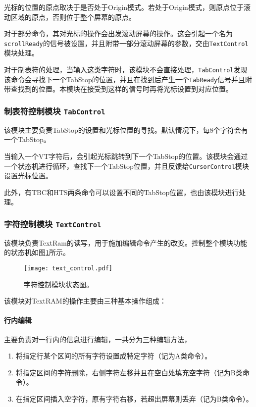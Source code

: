 光标的位置的原点取决于是否处于Origin模式。若处于Origin模式，则原点位于滚动区域的原点，否则位于整个屏幕的原点。

对于部分命令，其对光标的操作会出发滚动屏幕的操作。这会引起一个名为\texttt{scrollReady}的信号被设置，并且附带一部分滚动屏幕的参数，交由\texttt{TextControl}模块处理。

对于制表符的处理，当输入这类字符时，该模块不会直接处理，\texttt{TabControl}发现该命令会寻找下一个TabStop的位置，并且在找到后产生一个\texttt{TabReady}信号并且附带查找到的位置。本模块在接受到这样的信号时再将光标设置到对应位置。

\subsubsection{制表符控制模块 \texttt{TabControl}}
该模块主要负责TabStop的设置和光标位置的寻找。默认情况下，每8个字符会有一个TabStop。

当输入一个VT字符后，会引起光标跳转到下一个TabStop的位置。该模块会通过一个状态机进行循环，查找下一个TabStop位置，并且反馈给\texttt{CursorControl}模块设置光标位置。

此外，有TBC和HTS两条命令可以设置不同的TabStop位置，也由该模块进行处理。
\subsubsection{字符控制模块 \texttt{TextControl}}
该模块负责TextRam的读写，用于施加编辑命令产生的改变。控制整个模块功能的状态机如图\ref{fig:text_control}所示。

\begin{figure}[htbp]
\centerline{
\texttt{[image: text\_control.pdf]}
}
\caption{字符控制模块状态图。}
\label{fig:text_control}
\end{figure}

该模块对TextRAM的操作主要由三种基本操作组成：

\paragraph{行内编辑}
主要负责对一行内的信息进行编辑，一共分为三种编辑方法，
\begin{enumerate}
	\item 将指定行某个区间的所有字符设置成特定字符（记为A类命令）。
	\item 将指定区间的字符删除，右侧字符左移并且在空白处填充空字符（记为B类命令）。
	\item 在指定区间插入空字符，原有字符右移，若超出屏幕则丢弃（记为B类命令）。
\end{enumerate}

